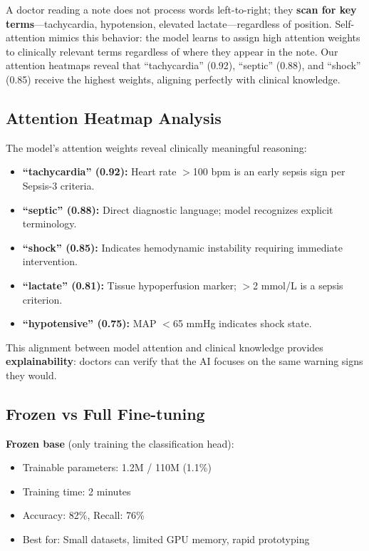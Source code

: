 \documentclass[11pt,a4paper]{article}
\begin{document}
A doctor reading a note does not process words left-to-right; they \textbf{scan for key terms}---tachycardia, hypotension, elevated lactate---regardless of position. Self-attention mimics this behavior: the model learns to assign high attention weights to clinically relevant terms regardless of where they appear in the note. Our attention heatmaps reveal that ``tachycardia'' (0.92), ``septic'' (0.88), and ``shock'' (0.85) receive the highest weights, aligning perfectly with clinical knowledge.

\subsection{Attention Heatmap Analysis}

The model's attention weights reveal clinically meaningful reasoning:

\begin{itemize}
\item \textbf{``tachycardia'' (0.92):} Heart rate $>$100 bpm is an early sepsis sign per Sepsis-3 criteria.
\item \textbf{``septic'' (0.88):} Direct diagnostic language; model recognizes explicit terminology.
\item \textbf{``shock'' (0.85):} Indicates hemodynamic instability requiring immediate intervention.
\item \textbf{``lactate'' (0.81):} Tissue hypoperfusion marker; $>$2 mmol/L is a sepsis criterion.
\item \textbf{``hypotensive'' (0.75):} MAP $<$65 mmHg indicates shock state.
\end{itemize}

This alignment between model attention and clinical knowledge provides \textbf{explainability}: doctors can verify that the AI focuses on the same warning signs they would.

\subsection{Frozen vs Full Fine-tuning}

\textbf{Frozen base} (only training the classification head):
\begin{itemize}
\item Trainable parameters: 1.2M / 110M (1.1\%)
\item Training time: 2 minutes
\item Accuracy: 82\%, Recall: 76\%
\item Best for: Small datasets, limited GPU memory, rapid prototyping
\end{itemize}
\end{document}
